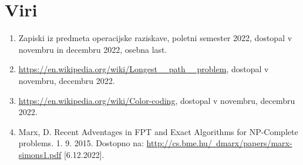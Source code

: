 \documentclass[a4paper, 9pt]{article}
\begin{document}
\section{Viri}
\begin{enumerate}
    \item Zapiski iz predmeta operacijske raziskave, poletni semester 2022, dostopal v novembru in decembru 2022, osebna last.
    \item \href{https://en.wikipedia.org/wiki/Longest \_ path \_ problem}{https://en.wikipedia.org/wiki/Longest \_ path \_ problem}, dostopal v novembru, decembru 2022.
    \item \href{https://en.wikipedia.org/wiki/Color-coding} {https://en.wikipedia.org/wiki/Color-coding}, dostopal v novembru, decembru 2022.
    \item Marx, D. Recent Adventages in FPT and Exact Algorithms for NP-Complete problems. 1. 9. 2015. Dostopno na: \href{http://cs.bme.hu/~dmarx/papers/marx-simons1.pdf} {http://cs.bme.hu/~dmarx/papers/marx-simons1.pdf} [6.12.2022].
\end{enumerate}
\end{document}
